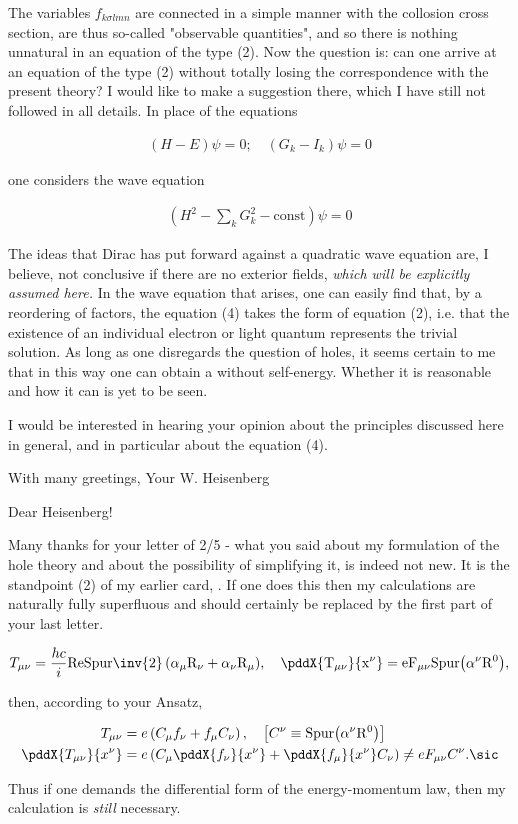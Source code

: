 \documentclass{article}
\newcommand{\nf}[2]{
\newcommand{#1}[1]{#2}
}
\newcommand{\rf}[2]{
\renewcommand{#1}[1]{#2}
}
\newcommand{\nequ}[2]{
\begin{align*}
#1
\tag{#2}
\end{align*}
}
\newcommand{\uequ}[1]{
\begin{align*}
#1
\end{align*}
}
\newcommand{\sumX}[1]{\underset{#1}{\sum}}
\begin{document}
The variables $f_{k\sigma lmn}$ are connected in a simple manner with the collosion cross section, are thus so-called "observable quantities", and so there is nothing unnatural in an equation of the type (2). Now the question is: can one arrive at an equation of the type (2) without totally losing the correspondence with the present theory? I would like to make a suggestion there, which I have still not followed in all details. In place of the equations
\nequ{
(H-E)\psi = 0;\quad (G_k - I_k)\psi = 0
}{3}
one considers the wave equation
\nequ{
(H^2 - \sumX{k}{G_k^2} - \text{const})\psi = 0
}{4}
The ideas that Dirac has put forward against a quadratic wave equation are, I believe, not conclusive if there are no exterior fields, \textit{which will be explicitly assumed here.} In the wave equation that arises, one can easily find that, by a reordering of factors, the equation (4) takes the form of equation (2), i.e. that the existence of an individual electron or light quantum represents the trivial solution. As long as one disregards the question of holes, it seems certain to me that in this way one can obtain a  without self-energy. Whether it is reasonable and how it can  is yet to be seen.

I would be interested in hearing your opinion about the principles discussed here in general, and in particular about the equation (4).

With many greetings,
Your W. Heisenberg

\date{February 6, 1934}

\rf{\Re}{\operatorfont{Re}{#1}}
\nf{\Spur}{\operatorfont{Spur}{#1}}

Dear Heisenberg!

Many thanks for your letter of 2/5 - what you said about my formulation of the hole theory and about the possibility of simplifying it, is indeed not new. It is the standpoint (2) of my earlier card, . If one does this then my calculations are naturally fully superfluous and should certainly be replaced by the first part of your last letter. 
\uequ{
T_{\mu\nu} = \frac{hc}{i}\Re{\Spur{\inv{2}\left(\alpha_\mu R_\nu + \alpha_\nu R_\mu\right)}},\quad
\pddX{T_{\mu\nu}}{x^\nu} = eF_{\mu\nu}\Spur{\left(\alpha^\nu R^0 \right)},
}
then, according to your Ansatz,
\uequ{
T_{\mu\nu} &= e\left(C_\mu f_\nu + f_\mu C_\nu\right),\quad 
\left[C^\nu \equiv \Spur{\left(\alpha^\nu R^0\right)}\right]\\
\pddX{T_{\mu\nu}}{x^\nu} &= 
e\left(C_\mu \pddX{f_\nu}{x^\nu} + \pddX{f_\mu}{x^\nu}C_\nu\right) \neq e F_{\mu\nu}C^\nu.\sic
}
Thus if one demands the differential form of the energy-momentum law, then my calculation is \textit{still} necessary.
\end{document}
